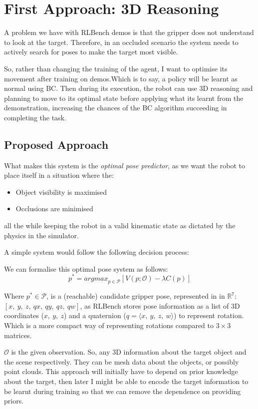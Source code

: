 \section{First Approach: 3D Reasoning}
A problem we have with RLBench demos is that the gripper does not understand to look at the target. Therefore, in an occluded scenario the system needs to actively search for poses to make the target most visible.

So, rather than changing the training of the agent, I want to optimise its movement after training on demos.Which is to say, a policy will be learnt as normal using BC. Then during its execution, the robot can use 3D reasoning and  planning to move to its optimal state before applying what its learnt from the demonstration, increasing the chances of the BC algorithm succeeding in completing the task.

\subsection{Proposed Approach}
What makes this system is the \emph{optimal pose predictor}, as we want the robot to place itself in a situation where the:
\begin{itemize}
  \item Object visibility is maximised
  \item Occlusions are minimised
\end{itemize}
all the while keeping the robot in a valid kinematic state as dictated by the physics in the simulator.


A simple system would follow the following decision process:

We can formalise this optimal pose system as follows:
\[
p^* = {argmax}_{p \in \mathcal{P}}
  \left[
    V \left( p; \mathcal{O} \right)
    - 
    \lambda C\left( p \right)
  \right]
\]

Where \(p^* \in \mathcal{P}\), is a (reachable) candidate gripper pose, represented in in \(\mathbb{R}^7\): \( \left[ x, ~y, ~z, ~qx, ~qy, ~qz, ~qw\right]\), as RLBench stores pose information as a list of 3D coordinates (\(x, ~y, ~z\)) and a quaternion (\(q = \langle x, ~y, ~z, ~w \rangle \)) to represent rotation. Which is a more compact way of representing rotations compared to $3\times3$ matrices.

$\mathcal{O}$ is the given observation. So, any  3D information about the target object and the scene respectively. They can be mesh data about the objects, or possibly point clouds. This approach will initially have to depend on prior knowledge about the target, then later I might be able to encode the target information to be learnt during training so that we can remove the dependence on providing priors.

